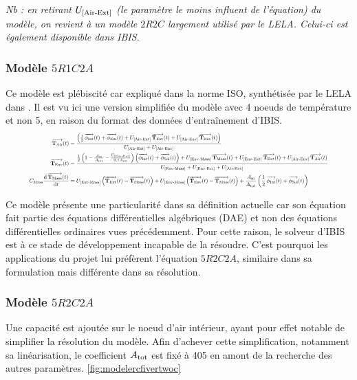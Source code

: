             \textit{Nb : en retirant $U_{\left[\text{Air-Ext}\right]}$ (le paramètre le moins influent de l'équation) du modèle, on revient à un modèle $2R2C$ largement utilisé par le LELA. Celui-ci est également disponible dans IBIS.}

        \subsubsection{Modèle $5R1C2A$}
            Ce modèle est plébiscité car expliqué dans la norme ISO\cite{noauthor_performance_nodate}, synthétisée par le LELA dans \cite{rapport_rc_antoine}.
            Il est vu ici une version simplifiée du modèle avec 4 noeuds de température et non 5, en raison du format des données d'entraînement d'IBIS\@.
            \begin{equation}\label{eq:fiveronec}
                \resizebox{0.9\linewidth}{!}{$\begin{split}
                     \TAir{t} &= \frac{\left(\frac{1}{2}\PhiInt{t}+\PhiEm{t}+\UAirExt\TExt{t}+\UAirEnv\TEnv{t}\right)}{\UAirExt + \UAirEnv}\\
                     \TEnv{t} &= \frac{\frac{1}{2}\left(1-\frac{\Am}{\Atot}-\frac{\UEnvExt}{9,1\Atot}\right)\left(\PhiInt{t}+\PhiSol{t}\right) + \UEnvMass\TMass{t} + \UEnvExt\TExt{t} + \UAirEnv\TAir{t}}{\UEnvMass + \UEnvExt + \UAirEnv}\\
                     \CMass\frac{\mathrm{d}\TMass{t}}{\mathrm dt} &= \UExtMass\left(\TExt{t}-\TMass{t}\right) + \UEnvMass\left(\TEnv{t} - \TMass{t}\right) + \frac{\Am}{\Atot}\left(\frac{1}{2}\PhiInt{t}+\PhiSol{t}\right)
                \end{split}$}
            \end{equation}
            \begin{bluebox}
                Ce modèle présente une particularité dans sa définition actuelle car son équation fait partie des équations différentielles algébriques (DAE) et non des équations différentielles ordinaires vues précédemment.
                Pour cette raison, le solveur d'IBIS est à ce stade de développement incapable de la résoudre.
                C'est pourquoi les applications du projet lui préfèrent l'équation $5R2C2A$, similaire dans sa formulation mais différente dans sa résolution.
            \end{bluebox}
        \subsubsection{Modèle $5R2C2A$}
            Une capacité est ajoutée sur le noeud d'air intérieur, ayant pour effet notable de simplifier la résolution du modèle.
            Afin d'achever cette simplification, notamment sa linéarisation, le coefficient $A_{\text{tot}}$ est fixé à 405 en amont de la recherche des autres paramètres.
            \ref{fig:modelercfivertwoc}

